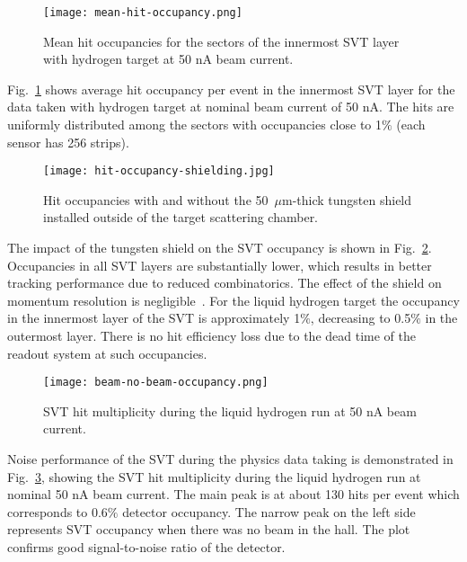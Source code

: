 \begin{figure}[hbt] 
\centering 
\texttt{[image: mean-hit-occupancy.png]}
\caption{Mean hit occupancies for the sectors of the innermost SVT layer with hydrogen target at 50 nA beam current.}
\label{fig:mean-hit-occupancy}
\end{figure}

Fig.~\ref{fig:mean-hit-occupancy} shows average hit occupancy per event in the innermost SVT layer for the data taken with hydrogen target at nominal beam current of 50 nA. The hits are uniformly distributed among the sectors with occupancies close to 1$\%$ (each sensor has 256 strips).

\begin{figure}[hbt] 
\centering 
\texttt{[image: hit-occupancy-shielding.jpg]}
\caption{Hit occupancies with and without the 50~$\mu$m-thick tungsten shield installed outside of the target scattering chamber.}
\label{fig:hit-occupancy-shielding}
\end{figure}

The impact of the tungsten shield on the SVT occupancy is shown in Fig.~\ref{fig:hit-occupancy-shielding}. Occupancies in all SVT layers are substantially lower, which results in better tracking performance due to reduced combinatorics. The effect of the shield on momentum resolution is negligible~\cite{SHIELDNOTE}. For the liquid hydrogen target the occupancy in the innermost layer of the SVT is approximately 1$\%$, decreasing to 0.5$\%$ in the outermost layer. There is no hit efficiency loss due to the dead time of the readout system at such occupancies.

\begin{figure}[hbt] 
\centering 
\texttt{[image: beam-no-beam-occupancy.png]}
\caption{SVT hit multiplicity during the liquid hydrogen run at 50 nA beam current.}
\label{fig:beam-no-beam-occupancy}
\end{figure}

Noise performance of the SVT during the physics data taking is demonstrated in Fig.~\ref{fig:beam-no-beam-occupancy}, showing the SVT hit multiplicity during the liquid hydrogen run at nominal 50 nA beam current. The main peak is at about 130 hits per event which corresponds to 0.6$\%$ detector occupancy. The narrow peak on the left side represents SVT occupancy when there was no beam in the hall. The plot confirms good signal-to-noise ratio of the detector. 

